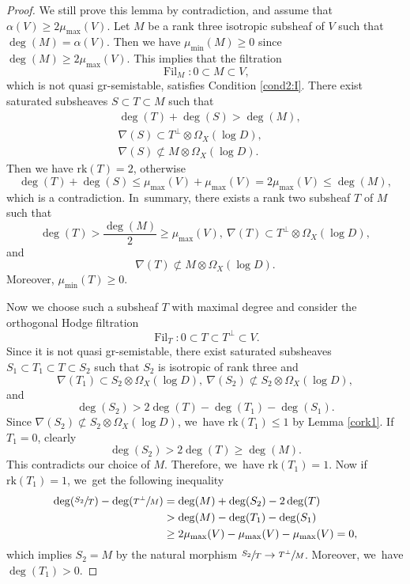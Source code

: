 \documentclass[JEP,XML,SOM,Unicode,published]{cedram}
\newcommand{\grsemistable}{gr\nobreakdash-semi\-stable\xspace}
\DeclareMathOperator{\Filt}{Fil}
\newcommand{\rk}{\mathrm{rk}}
\theoremstyle{plain}
\theoremstyle{definition}
\begin{document}
\begin{proof}
We still prove this lemma by contradiction, and assume that $\alpha(V)\geq2\mu_{\max}(V)$. Let $M$ be a rank three isotropic subsheaf of $V$ such that $\deg(M)=\alpha(V)$. Then we have $\mu_{\min}(M)\geq0$ since $\deg(M)\geq 2\mu_{\max}(V)$. This implies that the filtration
\[
\Filt_{M}:0\subset M\subset V,
\]
which is not quasi \grsemistable, satisfies Condition \eqref{cond2:I}. There exist saturated subsheaves $S\subset T\subset M$ such that
\begin{align*}
& \deg(T)+\deg(S)>\deg(M), \\
& \nabla(S)\subset T^\perp\otimes\Omega_X(\log D), \\
& \nabla(S)\not\subset M\otimes\Omega_X(\log D).
\end{align*}
Then we have $\rk(T)=2$, otherwise
\[
\deg(T)+\deg(S)\leq \mu_{\max}(V)+\mu_{\max}(V)=2\mu_{\max}(V)\leq \deg(M),
\]
which is a contradiction. In~summary, there exists a rank two subsheaf $T$ of $M$ such that
\[
\deg(T)>\frac{\deg(M)}{2}\geq \mu_{\max}(V),\ \nabla(T)\subset T^\perp\otimes\Omega_X(\log D),
\]
and
\[
\nabla(T)\not\subset M\otimes\Omega_X(\log D).
\]
Moreover, $\mu_{\min}(T)\geq 0$.

Now we choose such a subsheaf $T$ with maximal degree and consider the orthogonal Hodge filtration
\[
\Filt_{T}:0\subset T\subset T^\perp\subset V.
\]
Since it is not quasi \grsemistable, there exist saturated subsheaves $S_1\subset T_1\subset T\subset S_2$ such that $S_2$ is isotropic of rank three and
\[
\nabla(T_1)\subset S_2\otimes\Omega_X(\log D),\ \nabla(S_2)\not\subset S_2\otimes\Omega_X(\log D),
\]
and
\[
\deg(S_2)>2\deg(T)-\deg(T_1)-\deg(S_1).
\]
Since $\nabla(S_2)\not\subset S_2\otimes\Omega_X(\log D)$, we~have $\rk(T_1)\leq1$ by Lemma \ref{cork1}. If $T_1=0$, clearly
\[
\deg(S_2)>2\deg(T)\geq \deg(M).
\]
This contradicts our choice of $M$. Therefore, we~have $\rk(T_1)=1$. Now if $\rk(T_1)=1$, we~get the following inequality
\begin{equation*}
\begin{split}
\deg(\sfrac{S_2}{T})-\deg(\sfrac{T^\perp}{M})&=\deg(M)+\deg(S_2)-2\deg(T)\\
&>\deg(M)-\deg(T_1)-\deg(S_1)\\
&\ge2\mu_{\max}(V)-\mu_{\max}(V)-\mu_{\max}(V)=0,
\end{split}
\end{equation*}
which implies $S_2=M$ by the natural morphism $\sfrac{S_2}{T}\to \sfrac{T^\perp}{M}$. Moreover, we~have $\deg(T_1)>0$.


\end{proof}
\end{document}

